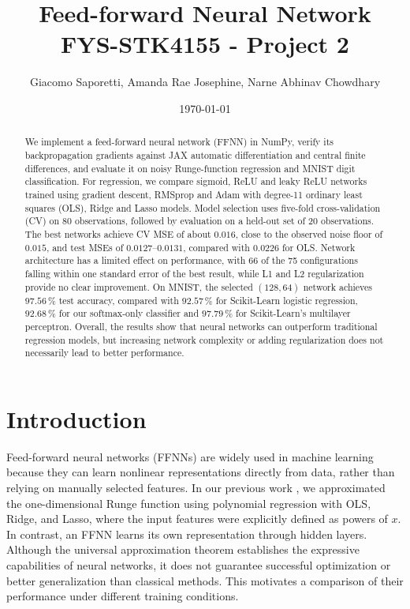 \documentclass[amssymb,twocolumn,aps]{revtex4}
\begin{document}
	
\title{Feed-forward Neural Network \\
    \normalsize FYS-STK4155 - Project 2}
\date{\today}               
\author{Giacomo Saporetti, Amanda Rae Josephine, Narne Abhinav Chowdhary}

\newpage
	
\begin{abstract}
We implement a feed-forward neural network (FFNN) in NumPy, verify its backpropagation gradients against JAX automatic differentiation and central finite differences, and evaluate it on noisy Runge-function regression and MNIST digit classification. For regression, we compare sigmoid, ReLU and leaky ReLU networks trained using gradient descent, RMSprop and Adam with degree-11 ordinary least squares (OLS), Ridge and Lasso models. Model selection uses five-fold cross-validation (CV) on 80 observations, followed by evaluation on a held-out set of 20 observations. The best networks achieve CV MSE of about $0.016$, close to the observed noise floor of $0.015$, and test MSEs of $0.0127$--$0.0131$, compared with $0.0226$ for OLS. Network architecture has a limited effect on performance, with 66 of the 75 configurations falling within one standard error of the best result, while L1 and L2 regularization provide no clear improvement. On MNIST, the selected $(128,64)$ network achieves $97.56\,\%$ test accuracy, compared with $92.57\,\%$ for Scikit-Learn logistic regression, $92.68\,\%$ for our softmax-only classifier and $97.79\,\%$ for Scikit-Learn's multilayer perceptron. Overall, the results show  that neural networks can outperform traditional regression models, but increasing network complexity or adding regularization does not necessarily lead to better performance.
\end{abstract}

\maketitle

\section{Introduction}
\label{sec:introduction}
Feed-forward neural networks (FFNNs) are widely used in machine learning because they can learn nonlinear representations directly from data, rather than relying on manually selected features. In our previous work \cite{project1}, we approximated the one-dimensional Runge function using polynomial regression with OLS, Ridge, and Lasso, where the input features were explicitly defined as powers of $x$. In contrast, an FFNN learns its own representation through hidden layers. Although the universal approximation theorem \cite{hornik1989} establishes the expressive capabilities of neural networks, it does not guarantee successful optimization or better generalization than classical methods. This motivates a comparison of their performance under different training conditions.
\end{document}
